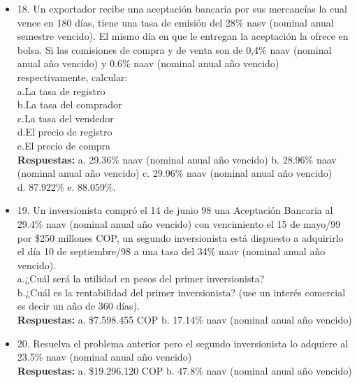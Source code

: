 \begin{itemize}
 \item 18. Un exportador recibe una aceptación bancaria por sus mercancías la cual vence en 180 días, tiene una tasa de emisión del 28\% nasv (nominal anual semestre vencido). El mismo día en que le entregan la aceptación la ofrece en bolsa. Si las comisiones de compra y de venta son de 0,4\% naav (nominal anual año vencido) y 0.6\% naav (nominal anual año vencido) respectivamente, calcular:\\
       a.La tasa de registro\\
       b.La tasa del comprador\\
       c.La tasa del vendedor\\
       d.El precio de registro\\
       e.El precio de compra\\
       \textbf{Respuestas:} a. 29.36\% naav (nominal anual año vencido)\hspace{0,5cm} b. 28.96\% naav (nominal anual año vencido)\hspace{0,5cm}  c. 29.96\% naav (nominal anual año vencido)\hspace{0,5cm} \\
       d. 87.922\% \hspace{0,5cm} e. 88.059\%.\\
       \medskip

 \item 19. Un inversionista compró el 14 de junio 98 una Aceptación Bancaria al 29.4\% naav (nominal anual año vencido) con vencimiento el 15 de mayo/99 por \$250 millones COP, un segundo inversionista está dispuesto a adquirirlo el día 10 de septiembre/98 a una tasa del 34\% naav (nominal anual año vencido).\\
       a.¿Cuál será la utilidad en pesos del primer inversionista?\\
       b.¿Cuál es la rentabilidad del primer inversionista? (use un interés comercial es decir un año de 360 días).\\
       \textbf{Respuestas:} a. \$7.598.455 COP\hspace{1.0cm} b. 17.14\% naav (nominal anual año vencido)\\
       \medskip

 \item 20. Resuelva el problema anterior pero el segundo inversionista lo adquiere al 23.5\% naav (nominal anual año vencido)\\
       \textbf{Respuestas:} a. \$19.296.120 COP\hspace{1,0cm} b. 47.8\% naav (nominal anual año vencido)\\
       \medskip


\end{itemize}
